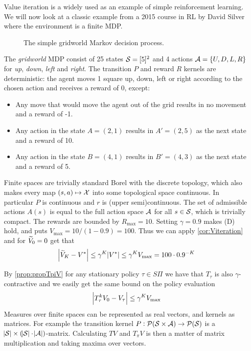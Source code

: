Value iteration is a widely used as an example of simple
reinforcement learning.
We will now look at a classic example from a
2015 course in RL by David Silver where the environment is a
finite MDP.
\begin{example}[Gridworld]
  \begin{figure}[h]
    \centering
    \caption{The simple gridworld Markov decision process.}
  \end{figure}
  The \emph{gridworld} MDP consist of 25 states $\mathcal{S} = [5]^2$ and 4 actions
  $\mathcal{A} = \{U, D, L, R\}$ for \emph{up}, \emph{down}, \emph{left} and 
  \emph{right}. The transition $P$ and reward $R$ kernels are deterministic:
  the agent moves 1 square up, down, left or right according to the chosen
  action and receives a reward of 0, except:
  \begin{itemize}
    \item Any move that would move the
      agent out of the grid results in no movement and a reward of -1.
    \item Any action in the state $A = (2,1)$ results in $A' = (2,5)$ as
      the next state and a reward of 10.
    \item Any action in the state $B = (4,1)$ results in $B' = (4,3)$ as
      the next state and a reward of 5.
  \end{itemize}
  Finite spaces are trivially standard Borel with the discrete topology,
  which also makes every map $(s, a) \mapsto \mathcal{X}$ into some
  topological space continuous. In particular $P$ is continuous and
  $r$ is (upper semi)continuous.
  The set of admissible actions $A(s)$ is equal to the
  full action space $\mathcal{A}$ for all $s \in \mathcal{S}$, which is trivially
  compact.
  The rewards are bounded by $R_{\max} = 10$.
  Setting $\gamma = 0.9$ makes (D) hold, and puts
  $V_{\max} = 10/(1-0.9) = 100$.
  Thus we can apply \cref{cor:Viteration} and for $\widetilde{V}_0 = 0$ get that
  \[ \abs{\widetilde{V}_K - V^*} \leq \gamma^K \abs{V^*}
  \leq \gamma^K V_{\max} = 100 \cdot 0.9^{-K} \]
  
  By \cref{prop:propTpiV} for any stationary policy $\tau \in S\Pi$ we have
  that $T_\tau$ is also $\gamma$-contractive and we
  easily get the same bound on the policy evaluation
  \[ \abs{T_\tau^k V_0 - V_\tau} \leq \gamma^K V_{\max} \]
  Measures over finite spaces can be represented as real vectors,
  and kernels as matrices.
  For example the transition kernel
  $P: \mathcal{P}(\mathcal{S} \times \mathcal{A}) \to \mathcal{P}(\mathcal{S})$
  is a $\abs{\mathcal{S}} \times (\abs{\mathcal{S}} \cdot \abs{\mathcal{A}})$-matrix.
  Calculating $TV$ and $T_\pi V$ is then a matter of matrix multiplication
  and taking maxima over vectors.


\end{example}
